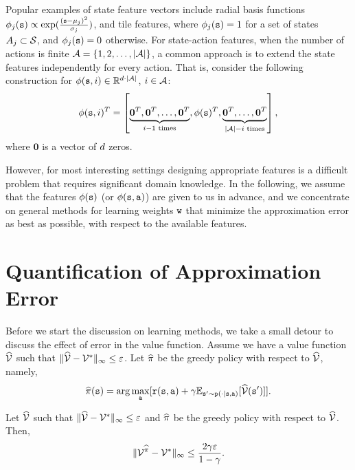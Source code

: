 Popular examples of state feature vectors include radial basis functions $\phi_j({\tt s}) \propto \exp(\frac{({\tt s}-\mu_j)^2}{\sigma_j})$, and tile features, where $\phi_j({\tt s}) = 1$ for a set of states $A_j \subset \mathcal{S}$, and $\phi_j({\tt s}) = 0$ otherwise. For state-action features, when the number of actions is finite $\mathcal{A} = \left\{1,2,\dots,|\mathcal{A}|\right\}$, a common approach is to extend the state features independently for every action. That is, consider the following construction for $\phi({\tt s},i)\in \mathbb{R}^{d \cdot |\mathcal{A}|}$, $i\in \mathcal{A}$:
\begin{equation*}
    \phi({\tt s},i)^T = \left[ \underbrace{\mathbf{0}^T, \mathbf{0}^T, \dots, \mathbf{0}^T}_{i-1 \text{ times}}, \phi({\tt s})^T, \underbrace{\mathbf{0}^T, \dots, \mathbf{0}^T}_{|\mathcal{A}|-i \text{ times}}\right],
\end{equation*}
where $\mathbf{0}$ is a vector of $d$ zeros.

However, for most interesting settings designing appropriate features is a difficult problem that requires significant domain knowledge. In the following, we assume that the features $\phi({\tt s})$ (or $\phi({\tt s},{\tt a})$) are given to us in advance, and we concentrate on general methods for learning weights ${\tt w}$ that minimize the approximation error as best as possible, with respect to the available features. 

\section{Quantification of Approximation Error}

Before we start the discussion on learning methods, we take a small detour to discuss the effect of error in the value function. Assume we
have a value function $\widehat{\mathcal{V}}$ such that $\|\widehat{\mathcal{V}}-\mathcal{V}^*\|_\infty\leq
\varepsilon$. Let $\widehat{\pi}$ be the greedy policy with respect to
$\widehat{\mathcal{V}}$, namely,
\[
\widehat{\pi}({\tt s})=\arg\max_{\tt a} [{\tt r}({\tt s},{\tt a})+\gamma
\mathbb{E}_{{\tt s}'\sim {\tt p}(\cdot|{\tt s},{\tt a})}[\widehat{\mathcal{V}}({\tt s}')]].
\]


\begin{theorem}\label{thm:approx_error}
Let $\widehat{\mathcal{V}}$ such that $\|\widehat{\mathcal{V}}-\mathcal{V}^*\|_\infty\leq \varepsilon$ and
$\widehat{\pi}$ be the greedy policy with respect to $\widehat{\mathcal{V}}$. Then,
\[
\|\mathcal{V}^{\widehat{\pi}}-\mathcal{V}^*\|_\infty\leq\frac{2\gamma\varepsilon}{1-\gamma}.
\]
\end{theorem}

